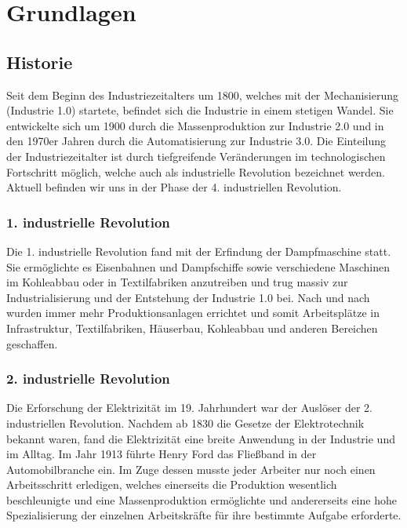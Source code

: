 \chapter{Grundlagen}

\section{Historie}

Seit dem Beginn des Industriezeitalters um 1800, welches mit der Mechanisierung (Industrie 1.0) startete, befindet sich die Industrie in einem stetigen Wandel. Sie entwickelte sich um 1900 durch die Massenproduktion zur Industrie 2.0 und in den 1970er Jahren durch die Automatisierung zur Industrie 3.0. Die Einteilung der Industriezeitalter ist durch tiefgreifende Veränderungen im technologischen Fortschritt möglich, welche auch als industrielle Revolution bezeichnet werden. Aktuell befinden wir uns in der Phase der 4. industriellen Revolution.

\subsection{1. industrielle Revolution}

Die 1. industrielle Revolution fand mit der Erfindung der Dampfmaschine statt. Sie ermöglichte es Eisenbahnen und Dampfschiffe sowie verschiedene Maschinen im Kohleabbau oder in Textilfabriken anzutreiben und trug massiv zur Industrialisierung und der Entstehung der Industrie 1.0 bei. Nach und nach wurden immer mehr Produktionsanlagen errichtet und somit Arbeitsplätze in Infrastruktur, Textilfabriken, Häuserbau, Kohleabbau und anderen Bereichen geschaffen.

\subsection{2. industrielle Revolution}

Die Erforschung der Elektrizität im 19. Jahrhundert war der Auslöser der 2. industriellen Revolution. Nachdem ab 1830 die Gesetze der Elektrotechnik bekannt waren, fand die Elektrizität eine breite Anwendung in der Industrie und im Alltag. Im Jahr 1913 führte Henry Ford das Fließband in der Automobilbranche ein. Im Zuge dessen musste jeder Arbeiter nur noch einen Arbeitsschritt erledigen, welches einerseits die Produktion wesentlich beschleunigte und eine Massenproduktion ermöglichte und andererseits eine hohe Spezialisierung der einzelnen Arbeitskräfte für ihre bestimmte Aufgabe erforderte.


